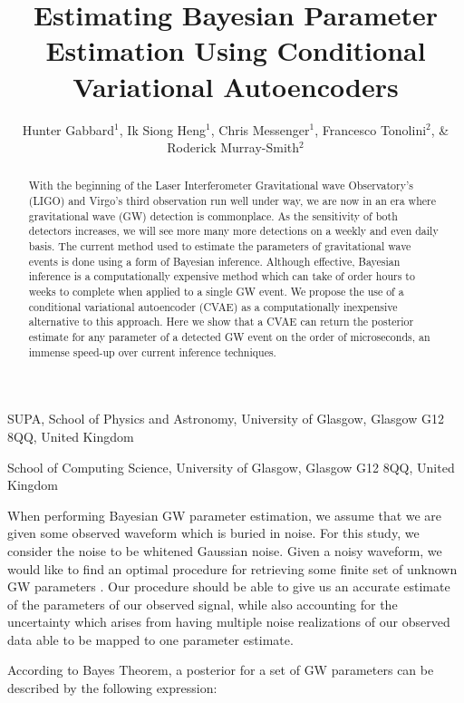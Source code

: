 \documentclass{nature}
\title{Estimating Bayesian Parameter Estimation Using Conditional Variational Autoencoders}
\author{Hunter Gabbard$^{1}$, Ik Siong Heng$^1$, Chris Messenger$^1$, Francesco Tonolini$^2$, \& Roderick Murray-Smith$^2$}
\begin{document}
\maketitle

\begin{affiliations}
 \item SUPA, School of Physics and Astronomy, University of Glasgow, Glasgow G12 8QQ, United Kingdom
 \item School of Computing Science, University of Glasgow, Glasgow G12 8QQ, United Kingdom
\end{affiliations}

%
%
\begin{abstract}
With the beginning of the Laser Interferometer Gravitational wave Observatory's 
(LIGO) and Virgo's third observation run well under way, we are now in an era 
where gravitational wave (GW) detection is commonplace. As the sensitivity of 
both detectors increases, we will see more many more detections on a weekly 
and even daily basis.  The current method used to estimate the parameters of 
gravitational wave events is done using a form of Bayesian inference. Although 
effective, Bayesian inference is a computationally expensive method which can 
take of order hours to weeks to complete when applied to a single GW event. We 
propose the use of a conditional variational autoencoder (CVAE) as a 
computationally inexpensive alternative to this approach. Here we show that 
a CVAE can return the posterior estimate for any parameter of a detected GW 
event on the order of microseconds, an immense speed-up over current 
inference techniques.
\end{abstract}

%
%
When performing Bayesian GW parameter estimation, we assume that we are given 
some observed waveform which is buried in noise. For this study, we consider 
the noise to be whitened Gaussian noise. Given a noisy waveform, we would like 
to find an optimal procedure for retrieving some finite set of unknown GW parameters 
\cite{Jaranowski2012}. Our procedure should be able to give us an accurate estimate 
of the parameters of our observed signal, while also accounting for the uncertainty 
which arises from having multiple noise realizations of our observed data able to 
be mapped to one parameter estimate.

%
%
According to Bayes Theorem, a posterior for a set of GW parameters can be described 
by the following expression:
\end{document}
